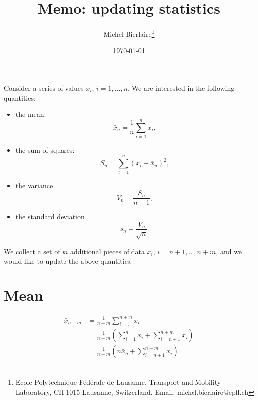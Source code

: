 \documentclass[12pt]{article}
\title{Memo: updating statistics}
\author{Michel Bierlaire\thanks{Ecole Polytechnique F\'ed\'erale de Lausanne, Transport and Mobility Laboratory, CH-1015 Lausanne,
Switzerland. Email: michel.bierlaire@epfl.ch}}
\date{\today}
\begin{document}

\newcommand{\prob}{\operatorname{Pr}}
\newcommand{\expect}{\operatorname{E}}
\newcommand{\req}[1]{(\ref{#1})}
\newcommand{\BIOGEME}{Biogeme}
\newcommand{\BIOSIM}{Biosim}
\newcommand{\PBIOGEME}{PythonBiogeme}


\newcommand{\paramitem}[1]{\texttt{#1}\index{default.par!#1}}
\newcommand{\specitem}[1]{\texttt{[#1]}\index{Model specification file!#1}}
\newcommand{\routeitem}[1]{\texttt{[#1]}\index{BIOROUTE!#1}}
\newcommand{\fileitem}[1]{\texttt{#1}\index{Files!#1}}

\newcommand{\C}{\mathcal{C}}
\newcommand{\R}{\mathbb{R}}
\renewcommand{\L}{\mathcal{L}}
\maketitle

Consider a series of values $x_i$, $i=1,\ldots,n$. We are interested
in the following quantities:
\begin{itemize}
\item the mean:
\begin{equation}
\bar{x}_n = \frac{1}{n} \sum_{i=1}^n x_i,
\end{equation}
\item the sum of squares:
\begin{equation}
S_n = \sum_{i=1}^n (x_i - \bar{x}_n)^2,
\end{equation}
\item the variance
\begin{equation}
V_n = \frac{S_n}{n-1},
\end{equation}
\item the standard deviation
\begin{equation}
s_n = \frac{V_n}{\sqrt{n}}.
\end{equation}
\end{itemize}
We collect a set of $m$ additional pieces of data $x_i$,
$i=n+1,\ldots,n+m$, and we would like to update the above quantities.

\section{Mean}
\begin{align}
\bar{x}_{n+m} & = \frac{1}{n+m} \sum_{i=1}^{n+m} x_i \\
             & = \frac{1}{n+m} \left(\sum_{i=1}^{n} x_i+\sum_{i=n+1}^{n+m} x_i\right) \\
             & = \frac{1}{n+m} \left(n \bar{x}_n +\sum_{i=n+1}^{n+m} x_i\right) \\
\end{align}
\end{document}
